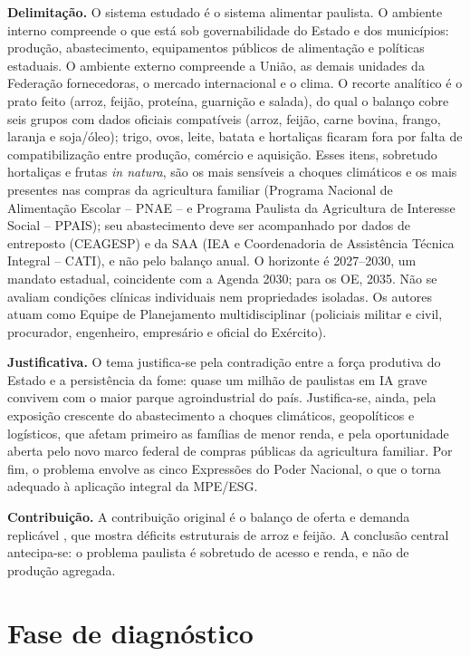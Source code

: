 \documentclass[
	12pt,				%
	openright,			%
	oneside,			%
	a4paper,			%
	chapter=TITLE,		%
	section=TITLE,		%
	english,			%
	french,				%
	spanish,			%
	brazil,				%
 ]{abntex2}
\begin{document}
\textbf{Delimitação.} O sistema estudado é o sistema alimentar paulista. O
ambiente interno compreende o que está sob governabilidade do Estado e dos
municípios: produção, abastecimento, equipamentos públicos de alimentação e
políticas estaduais. O ambiente externo compreende a União, as demais unidades
da Federação fornecedoras, o mercado internacional e o clima. O recorte
analítico é o prato feito (arroz, feijão, proteína, guarnição e salada), do qual
o balanço cobre seis grupos com dados oficiais compatíveis (arroz, feijão,
carne bovina, frango, laranja e soja/óleo); trigo, ovos, leite, batata e
hortaliças ficaram fora por falta de compatibilização entre produção, comércio
e aquisição. Esses itens, sobretudo hortaliças e frutas \textit{in natura}, são
os mais sensíveis a choques climáticos e os mais presentes nas compras da
agricultura familiar (Programa Nacional de Alimentação Escolar -- PNAE -- e
Programa Paulista da Agricultura de Interesse Social -- PPAIS); seu
abastecimento deve ser acompanhado por dados de entreposto (CEAGESP) e da SAA
(IEA e Coordenadoria de Assistência Técnica Integral -- CATI), e não pelo
balanço anual. O horizonte é 2027--2030, um mandato estadual, coincidente com a
Agenda 2030; para os OE, 2035. Não se avaliam condições clínicas individuais nem
propriedades isoladas. Os autores atuam como Equipe de Planejamento
multidisciplinar (policiais militar e civil, procurador, engenheiro, empresário
e oficial do Exército).

\textbf{Justificativa.} O tema justifica-se pela contradição entre a força
produtiva do Estado e a persistência da fome: quase um milhão de paulistas em IA
grave convivem com o maior parque agroindustrial do país. Justifica-se, ainda,
pela exposição crescente do abastecimento a choques climáticos, geopolíticos e
logísticos, que afetam primeiro as famílias de menor renda, e pela oportunidade
aberta pelo novo marco federal de compras públicas da agricultura familiar. Por
fim, o problema envolve as cinco Expressões do Poder Nacional, o que o torna
adequado à aplicação integral da MPE/ESG.

\textbf{Contribuição.} A contribuição original é o balanço de oferta e demanda
replicável \cite{tcc_adesg_repo}, que mostra déficits estruturais de
arroz e feijão. A conclusão central antecipa-se: o problema paulista é
sobretudo de acesso e renda, e não de produção agregada.

\chapter{Fase de diagnóstico}
\end{document}
